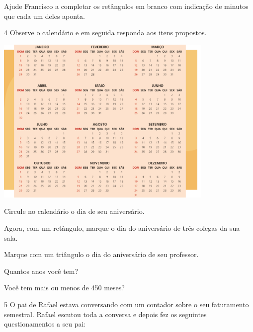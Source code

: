 Ajude Francisco a completar os retângulos em branco com indicação de
minutos que cada um deles aponta.


\num{4} Observe o calendário e em seguida responda aos itens propostos.


\includegraphics[width=4.13369in,height=3.20861in]{./media/image54.png}

\begin{escolha}
\item Circule no calendário o dia de seu aniversário.


\item Agora, com um retângulo, marque o dia do aniversário de três colegas da sua sala.


\item Marque com um triângulo o dia do aniversário de seu professor.


\item Quantos anos você tem?


\item Você tem mais ou menos de 450 meses?

\end{escolha}

\num{5} O pai de Rafael estava conversando com um contador sobre o seu
faturamento semestral. Rafael escutou toda a conversa e depois fez os
seguintes questionamentos a seu pai:

